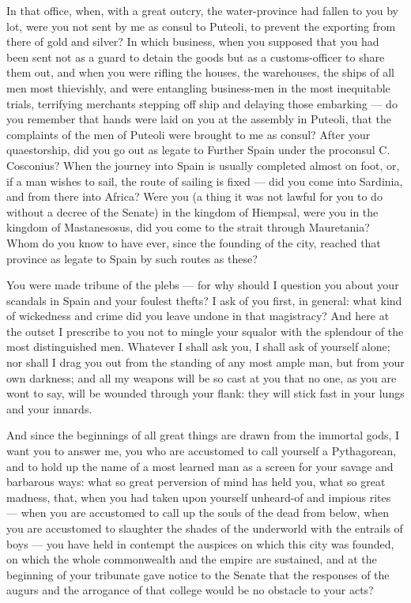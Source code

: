  In that office, when, with a great outcry, the water-province had fallen to you by lot, were you not sent by me as consul to Puteoli, to prevent the exporting from there of gold and silver? In which business, when you supposed that you had been sent not as a guard to detain the goods but as a customs-officer to share them out, and when you were rifling the houses, the warehouses, the ships of all men most thievishly, and were entangling business-men in the most inequitable trials, terrifying merchants stepping off ship and delaying those embarking --- do you remember that hands were laid on you at the assembly in Puteoli, that the complaints of the men of Puteoli were brought to me as consul? After your quaestorship, did you go out as legate to Further Spain under the proconsul C. Cosconius? When the journey into Spain is usually completed almost on foot, or, if a man wishes to sail, the route of sailing is fixed --- did you come into Sardinia, and from there into Africa? Were you (a thing it was not lawful for you to do without a decree of the Senate) in the kingdom of Hiempsal, were you in the kingdom of Mastanesosus, did you come to the strait through Mauretania? Whom do you know to have ever, since the founding of the city, reached that province as legate to Spain by such routes as these?

 You were made tribune of the plebs --- for why should I question you about your scandals in Spain and your foulest thefts? I ask of you first, in general: what kind of wickedness and crime did you leave undone in that magistracy? And here at the outset I prescribe to you not to mingle your squalor with the splendour of the most distinguished men. Whatever I shall ask you, I shall ask of yourself alone; nor shall I drag you out from the standing of any most ample man, but from your own darkness; and all my weapons will be so cast at you that no one, as you are wont to say, will be wounded through your flank: they will stick fast in your lungs and your innards.

 And since the beginnings of all great things are drawn from the immortal gods, I want you to answer me, you who are accustomed to call yourself a Pythagorean, and to hold up the name of a most learned man as a screen for your savage and barbarous ways: what so great perversion of mind has held you, what so great madness, that, when you had taken upon yourself unheard-of and impious rites --- when you are accustomed to call up the souls of the dead from below, when you are accustomed to slaughter the shades of the underworld with the entrails of boys --- you have held in contempt the auspices on which this city was founded, on which the whole commonwealth and the empire are sustained, and at the beginning of your tribunate gave notice to the Senate that the responses of the augurs and the arrogance of that college would be no obstacle to your acts?

